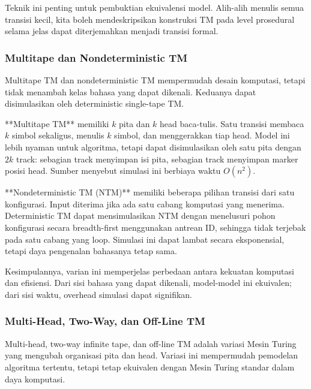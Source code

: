 Teknik ini penting untuk pembuktian ekuivalensi model. Alih-alih menulis semua transisi kecil, kita boleh mendeskripsikan konstruksi TM pada level prosedural selama jelas dapat diterjemahkan menjadi transisi formal.

\subsubsection{Multitape dan Nondeterministic TM}

\begin{jawab}
Multitape TM dan nondeterministic TM mempermudah desain komputasi, tetapi tidak menambah kelas bahasa yang dapat dikenali. Keduanya dapat disimulasikan oleh deterministic single-tape TM.
\end{jawab}

**Multitape TM** memiliki $k$ pita dan $k$ head baca-tulis. Satu transisi membaca $k$ simbol sekaligus, menulis $k$ simbol, dan menggerakkan tiap head. Model ini lebih nyaman untuk algoritma, tetapi dapat disimulasikan oleh satu pita dengan $2k$ track: sebagian track menyimpan isi pita, sebagian track menyimpan marker posisi head. Sumber menyebut simulasi ini berbiaya waktu $O(n^2)$.

**Nondeterministic TM (NTM)** memiliki beberapa pilihan transisi dari satu konfigurasi. Input diterima jika ada satu cabang komputasi yang menerima. Deterministic TM dapat mensimulasikan NTM dengan menelusuri pohon konfigurasi secara breadth-first menggunakan antrean ID, sehingga tidak terjebak pada satu cabang yang loop. Simulasi ini dapat lambat secara eksponensial, tetapi daya pengenalan bahasanya tetap sama.

Kesimpulannya, varian ini memperjelas perbedaan antara kekuatan komputasi dan efisiensi. Dari sisi bahasa yang dapat dikenali, model-model ini ekuivalen; dari sisi waktu, overhead simulasi dapat signifikan.

\subsubsection{Multi-Head, Two-Way, dan Off-Line TM}

\begin{jawab}
Multi-head, two-way infinite tape, dan off-line TM adalah variasi Mesin Turing yang mengubah organisasi pita dan head. Variasi ini mempermudah pemodelan algoritma tertentu, tetapi tetap ekuivalen dengan Mesin Turing standar dalam daya komputasi.
\end{jawab}

